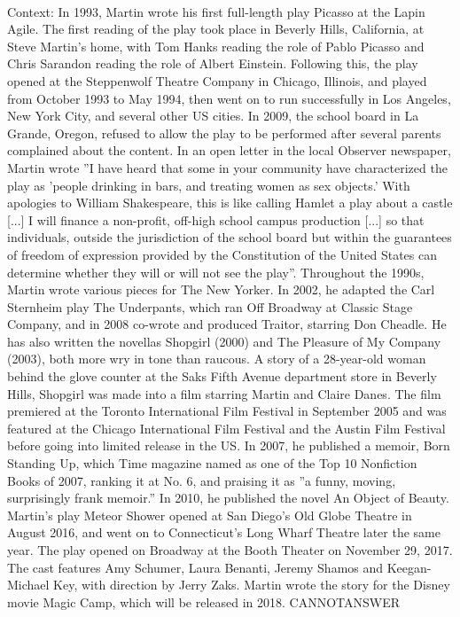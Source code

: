 \documentclass[11pt,a4paper, onecolumn]{article}
\begin{document}
\\ Context: In 1993, Martin wrote his first full-length play Picasso at the Lapin Agile. The first reading of the play took place in Beverly Hills, California, at Steve Martin's home, with Tom Hanks reading the role of Pablo Picasso and Chris Sarandon reading the role of Albert Einstein. Following this, the play opened at the Steppenwolf Theatre Company in Chicago, Illinois, and played from October 1993 to May 1994, then went on to run successfully in Los Angeles, New York City, and several other US cities. In 2009, the school board in La Grande, Oregon, refused to allow the play to be performed after several parents complained about the content. In an open letter in the local Observer newspaper, Martin wrote ''I have heard that some in your community have characterized the play as 'people drinking in bars, and treating women as sex objects.' With apologies to William Shakespeare, this is like calling Hamlet a play about a castle [...] I will finance a non-profit, off-high school campus production [...] so that individuals, outside the jurisdiction of the school board but within the guarantees of freedom of expression provided by the Constitution of the United States can determine whether they will or will not see the play''. Throughout the 1990s, Martin wrote various pieces for The New Yorker. In 2002, he adapted the Carl Sternheim play The Underpants, which ran Off Broadway at Classic Stage Company, and in 2008 co-wrote and produced Traitor, starring Don Cheadle. He has also written the novellas Shopgirl (2000) and The Pleasure of My Company (2003), both more wry in tone than raucous. A story of a 28-year-old woman behind the glove counter at the Saks Fifth Avenue department store in Beverly Hills, Shopgirl was made into a film starring Martin and Claire Danes. The film premiered at the Toronto International Film Festival in September 2005 and was featured at the Chicago International Film Festival and the Austin Film Festival before going into limited release in the US. In 2007, he published a memoir, Born Standing Up, which Time magazine named as one of the Top 10 Nonfiction Books of 2007, ranking it at No. 6, and praising it as ''a funny, moving, surprisingly frank memoir.'' In 2010, he published the novel An Object of Beauty. Martin's play Meteor Shower opened at San Diego's Old Globe Theatre in August 2016, and went on to Connecticut's Long Wharf Theatre later the same year. The play opened on Broadway at the Booth Theater on November 29, 2017. The cast features Amy Schumer, Laura Benanti, Jeremy Shamos and Keegan-Michael Key, with direction by Jerry Zaks. Martin wrote the story for the Disney movie Magic Camp, which will be released in 2018. CANNOTANSWER
\end{document}
